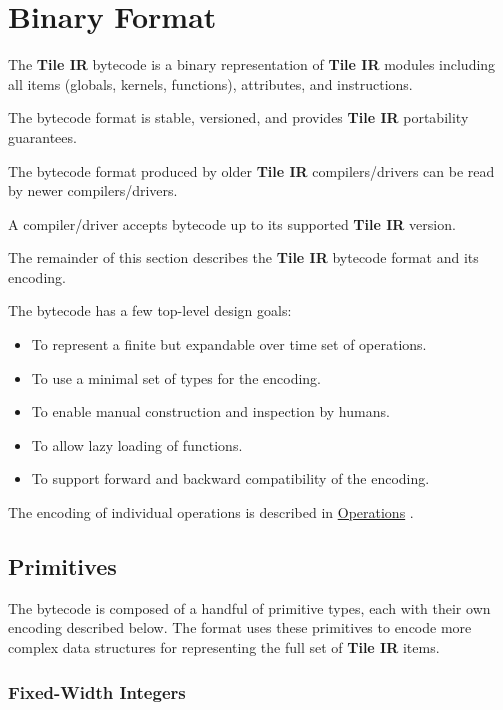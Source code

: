 \documentclass{article}
\begin{document}
\newpage
\section{Binary Format}

The \textbf{Tile IR} bytecode is a binary representation of \textbf{Tile IR} modules including all items (globals, kernels, functions), attributes, and instructions.


The bytecode format is stable, versioned, and provides \textbf{Tile IR} portability guarantees.

The bytecode format produced by older \textbf{Tile IR} compilers/drivers can be read by newer compilers/drivers.

A compiler/driver accepts bytecode up to its supported \textbf{Tile IR} version.


The remainder of this section describes the \textbf{Tile IR} bytecode format and its encoding.


The bytecode has a few top-level design goals:

\begin{itemize}
\item To represent a finite but expandable over time set of operations.
\item To use a minimal set of types for the encoding.
\item To enable manual construction and inspection by humans.
\item To allow lazy loading of functions.
\item To support forward and backward compatibility of the encoding.

\end{itemize}
The encoding of individual operations is described in \href{https://docs.nvidia.com/cuda/tile-ir/latest/sections/operations.html#section-operations}{Operations} .


\subsection{Primitives}

The bytecode is composed of a handful of primitive types, each with their own encoding described below. The format uses these primitives to encode more complex data structures for representing the full set of \textbf{Tile IR} items.


\subsubsection{Fixed-Width Integers}
\end{document}
